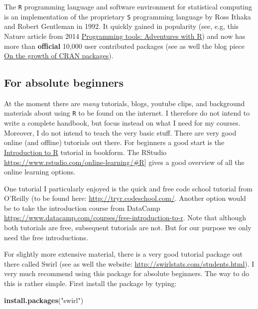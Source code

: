 \documentclass[]{article}
\newenvironment{Shaded}{\begin{snugshade}}{\end{snugshade}}
\newcommand{\KeywordTok}[1]{\textcolor[rgb]{0.13,0.29,0.53}{\textbf{{#1}}}}
\newcommand{\StringTok}[1]{\textcolor[rgb]{0.31,0.60,0.02}{{#1}}}
\newcommand{\NormalTok}[1]{{#1}}
\theoremstyle{definition}
\theoremstyle{definition}
\theoremstyle{definition}
\theoremstyle{remark}
\begin{document}
The \texttt{R} programming language and software environment for
statistical computing is an implementation of the proprietary \texttt{S}
programming language by Ross Ithaka and Robert Gentleman in 1992. It
quickly gained in popularity (see, e.g, this Nature article from 2014
\href{http://www.nature.com/news/programming-tools-adventures-with-r-1.16609}{Programming
tools: Adventures with R}) and now has more than \textbf{official}
10,000 user contributed packages (see as well the blog piece
\href{https://www.r-bloggers.com/on-the-growth-of-cran-packages/}{On the
growth of CRAN packages}).

\subsection{For absolute beginners}\label{for-absolute-beginners}

At the moment there are \emph{many} tutorials, blogs, youtube clips, and
background materials about using \texttt{R} to be found on the internet.
I therefore do not intend to write a complete handbook, but focus
instead on what I need for my courses. Moreover, I do not intend to
teach the very basic stuff. There are very good online (and offline)
tutorials out there. For beginners a good start is the
\href{http://colinfay.me/intro-to-r/}{Introduction to R} tutorial in
bookform. The RStudio
\url{https://www.rstudio.com/online-learning/\#R}{]} gives a good
overview of all the online learning options.

One tutorial I particularly enjoyed is the quick and free code school
tutorial from O'Reilly (to be found here:
\url{http://tryr.codeschool.com/}. Another option would be to take the
introduction course from DataCamp
\url{https://www.datacamp.com/courses/free-introduction-to-r}. Note that
although both tutorials are free, subsequent tutorials are not. But for
our purpose we only need the free introductions.

For slightly more extensive material, there is a very good tutorial
package out there called Swirl (see as well the website:
\url{http://swirlstats.com/students.html}). I very much recommend using
this package for absolute beginners. The way to do this is rather
simple. First install the package by typing:

\begin{Shaded}
\begin{Highlighting}[]
\KeywordTok{install.packages}\NormalTok{(}\StringTok{"swirl"}\NormalTok{)}
\end{Highlighting}
\end{Shaded}
\end{document}
